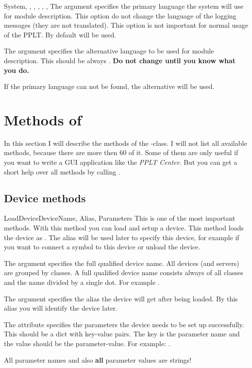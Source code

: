 \begin{classdesc}{System}{, , 
, , , 
, }
The argument  specifies the primary language the system will use for
module description. This option do not change the language of the logging 
messages (they are not translated). This option is not important for normal
usage of the PPLT. By default  will be used.

The argument  specifies the alternative language to be used
for module description. This should be always . \textbf{Do not 
change until you know what you do.} 

If the primary language can not be found, the alternative will be used. 
\end{classdesc}




\section{Methods of }
In this section I will describe the methods of the -class. I 
will not list all available methods, because there are more then 60 of it. Some
of them are only useful if you want to write a GUI application like the
\emph{PPLT Center}. But you can get a short help over all methods by calling
. 


\subsection{Device methods}
\begin{methoddesc}[System]{LoadDevice}{DeviceName, Alias, Parameters}
This is one of the most important methods. With this method you can load and
setup a device. This method loads the device  as . 
The alias will be used later to specify this device, for example if you want
to connect a symbol to this device or unload the device.

The argument  specifies the full qualified device name. All
devices (and servers) are grouped by classes. A full qualified device name
consists always of all classes and the name divided by a single dot. For
example .

The argument  specifies the alias the device will get after being
loaded. By this alias you will identify the device later.

The attribute  specifies the parameters the device needs to be
set up successfully. This should be a dict with key-value pairs. The key 
is the parameter name and the value should be the parameter-value. For example:
.
\begin{notice}
All parameter names and also \textbf{all} parameter values are strings!
\end{notice}
\end{methoddesc}


